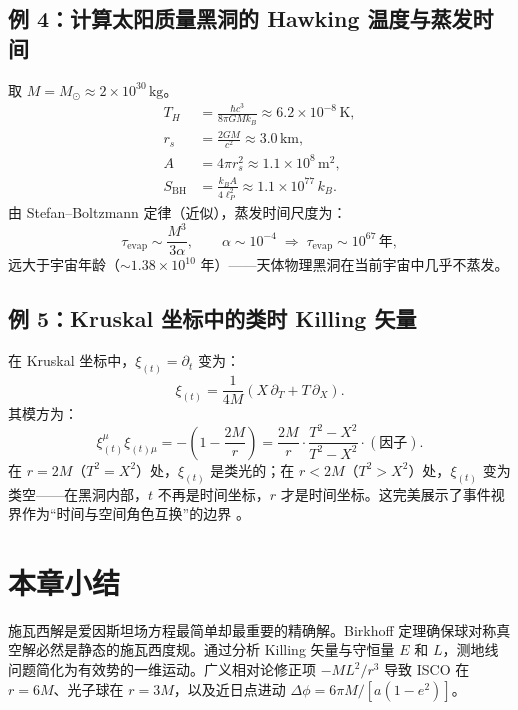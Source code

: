 \subsection{例 4：计算太阳质量黑洞的 Hawking 温度与蒸发时间}

取 $M = M_\odot \approx 2\times10^{30}\,\text{kg}$。
\begin{align}
    T_H &= \frac{\hbar c^3}{8\pi G M k_B} \approx 6.2\times10^{-8}\,\text{K}, \\
    r_s &= \frac{2GM}{c^2} \approx 3.0\,\text{km}, \\
    A &= 4\pi r_s^2 \approx 1.1\times10^{8}\,\text{m}^2, \\
    S_{\text{BH}} &= \frac{k_B A}{4\ell_P^2} \approx 1.1\times10^{77}\,k_B.
\end{align}
由 Stefan–Boltzmann 定律（近似），蒸发时间尺度为：
\begin{equation}
    \tau_{\text{evap}} \sim \frac{M^3}{3\alpha}, \qquad \alpha \sim 10^{-4} \;\Longrightarrow\; \tau_{\text{evap}} \sim 10^{67}\,\text{年},
\end{equation}
远大于宇宙年龄（$\sim 1.38\times10^{10}$ 年）——天体物理黑洞在当前宇宙中几乎不蒸发。

\subsection{例 5：Kruskal 坐标中的类时 Killing 矢量}

在 Kruskal 坐标中，$\xi_{(t)} = \partial_t$ 变为：
\begin{equation}
    \xi_{(t)} = \frac{1}{4M}\left(X\,\partial_T + T\,\partial_X\right).
\end{equation}
其模方为：
\begin{equation}
    \xi_{(t)}^\mu \xi_{(t)\mu} = -\left(1-\frac{2M}{r}\right) = \frac{2M}{r}\cdot\frac{T^2-X^2}{T^2-X^2} \cdot (\text{因子}).
\end{equation}
在 $r=2M$（$T^2=X^2$）处，$\xi_{(t)}$ 是类光的；在 $r<2M$（$T^2>X^2$）处，$\xi_{(t)}$ 变为类空——在黑洞内部，$t$ 不再是时间坐标，$r$ 才是时间坐标。这完美展示了事件视界作为“时间与空间角色互换”的边界 \cite{Carroll1997}。

\section*{本章小结}

施瓦西解是爱因斯坦场方程最简单却最重要的精确解。Birkhoff 定理确保球对称真空解必然是静态的施瓦西度规。通过分析 Killing 矢量与守恒量 $E$ 和 $L$，测地线问题简化为有效势的一维运动。广义相对论修正项 $-ML^2/r^3$ 导致 ISCO 在 $r=6M$、光子球在 $r=3M$，以及近日点进动 $\Delta\phi = 6\pi M/[a(1-e^2)]$。

